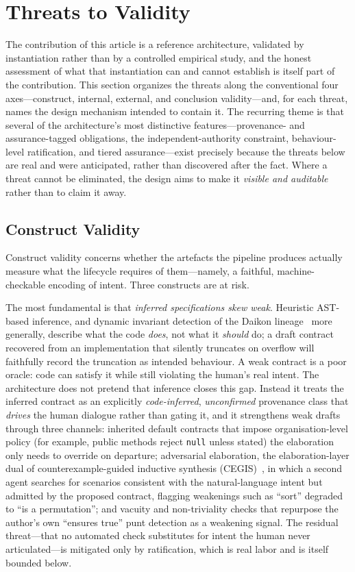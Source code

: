 \section{Threats to Validity}\label{sec:threats}

The contribution of this article is a reference architecture, validated by instantiation rather than by a controlled empirical study, and the honest assessment of what that instantiation can and cannot establish is itself part of the contribution. This section organizes the threats along the conventional four axes---construct, internal, external, and conclusion validity---and, for each threat, names the design mechanism intended to contain it. The recurring theme is that several of the architecture's most distinctive features---provenance- and assurance-tagged obligations, the independent-authority constraint, behaviour-level ratification, and tiered assurance---exist precisely because the threats below are real and were anticipated, rather than discovered after the fact. Where a threat cannot be eliminated, the design aims to make it \emph{visible and auditable} rather than to claim it away.

\subsection{Construct Validity}
\label{subsec:threats-construct}

Construct validity concerns whether the artefacts the pipeline produces actually measure what the lifecycle requires of them---namely, a faithful, machine-checkable encoding of intent. Three constructs are at risk.

The most fundamental is that \emph{inferred specifications skew weak}. Heuristic AST-based inference, and dynamic invariant detection of the Daikon lineage~\cite{ernst2007daikon} more generally, describe what the code \emph{does}, not what it \emph{should} do; a draft contract recovered from an implementation that silently truncates on overflow will faithfully record the truncation as intended behaviour. A weak contract is a poor oracle: code can satisfy it while still violating the human's real intent. The architecture does not pretend that inference closes this gap. Instead it treats the inferred contract as an explicitly \emph{code-inferred}, \emph{unconfirmed} provenance class that \emph{drives} the human dialogue rather than gating it, and it strengthens weak drafts through three channels: inherited default contracts that impose organisation-level policy (for example, public methods reject \texttt{null} unless stated) the elaboration only needs to override on departure; adversarial elaboration, the elaboration-layer dual of counterexample-guided inductive synthesis (CEGIS)~\cite{solarlezama2008sketching}, in which a second agent searches for scenarios consistent with the natural-language intent but admitted by the proposed contract, flagging weakenings such as ``sort'' degraded to ``is a permutation''; and vacuity and non-triviality checks that repurpose the author's own ``ensures true'' punt detection as a weakening signal. The residual threat---that no automated check substitutes for intent the human never articulated---is mitigated only by ratification, which is real labor and is itself bounded below.


